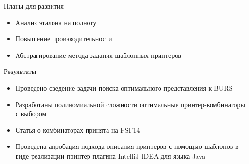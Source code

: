 \documentclass[sans]{beamer}
\begin{document}
\begin{frame}{Планы для развития}
  \begin{itemize}
    \item Анализ эталона на полноту
    \item Повышение производительности
    \item Абстрагирование метода задания шаблонных принтеров
  \end{itemize}
\end{frame}

\begin{frame}{Результаты}
  \begin{itemize}
    \small
    \item Проведено сведение задачи поиска оптимального представления к BURS
      \vfill
    \item Разработаны полиномиальной сложности оптимальные принтер-комбинаторы с выбором
      \vfill
    \item Статья о комбинаторах принята на PSI'14
      \vfill
    \item Проведена апробация подхода описания принтеров с помощью шаблонов
       в виде реализации принтер-плагина IntelliJ IDEA для языка Java
  \end{itemize}
  
\end{frame}
\end{document}
